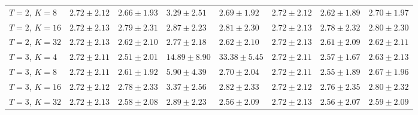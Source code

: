 \documentclass{article}
\begin{document}
\begin{table}[]
{\begin{tabular}{@{}llllllll@{}}
    $T=2$, $K=8$  & $2.72 \pm 2.12$  & $2.66 \pm 1.93$  & $3.29 \pm 2.51$  & $2.69 \pm 1.92$  & $2.72 \pm 2.12$   & $2.62 \pm 1.89$  & $2.70 \pm 1.97$ \\
    $T=2$, $K=16$ & $2.72 \pm 2.13$  & $2.79 \pm 2.31$  & $2.87 \pm 2.23$  & $2.81 \pm 2.30$  & $2.72 \pm 2.13$   & $2.78 \pm 2.32$  & $2.80 \pm 2.30$ \\
    $T=2$, $K=32$ & $2.72 \pm 2.13$  & $2.62 \pm 2.10$  & $2.77 \pm 2.18$  & $2.62 \pm 2.10$  & $2.72 \pm 2.13$   & $2.61 \pm 2.09$  & $2.62 \pm 2.11$ \\
    $T=3$, $K=4$  & $2.72 \pm 2.11$  & $2.51 \pm 2.01$  & $14.89 \pm 8.90$ & $33.38 \pm 5.45$ & $2.72 \pm 2.11$   & $2.57 \pm 1.67$  & $2.63 \pm 2.13$ \\
    $T=3$, $K=8$  & $2.72 \pm 2.11$  & $2.61 \pm 1.92$  & $5.90 \pm 4.39$  & $2.70 \pm 2.04$  & $2.72 \pm 2.11$   & $2.55 \pm 1.89$  & $2.67 \pm 1.96$ \\
    $T=3$, $K=16$ & $2.72 \pm 2.12$  & $2.78 \pm 2.33$  & $3.37 \pm 2.56$  & $2.82 \pm 2.33$  & $2.72 \pm 2.12$   & $2.76 \pm 2.35$  & $2.80 \pm 2.32$ \\
    $T=3$, $K=32$ & $2.72 \pm 2.13$  & $2.58 \pm 2.08$  & $2.89 \pm 2.23$  & $2.56 \pm 2.09$  & $2.72 \pm 2.13$   & $2.56 \pm 2.07$  & $2.59 \pm 2.09$ \\ \bottomrule
    \end{tabular}
}
\end{table}
\end{document}
